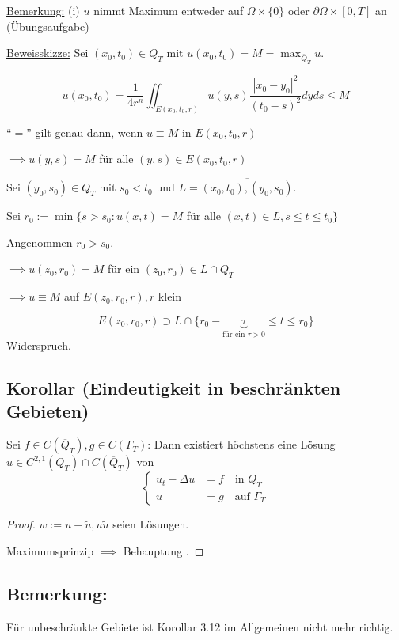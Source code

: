 \underline{Bemerkung:} (i) $u$ nimmt Maximum entweder auf $\Omega \times \{0\}$ oder $\partial \Omega \times [0, T]$ an (Übungsaufgabe)

\underline{Beweisskizze:} Sei $(x_0, t_0) \in Q_T$ mit $u(x_0, t_0) = M = \max_{\overline Q_T} u$.

$$
u(x_0, t_0) = \frac{1}{4r^n} \iint_{E(x_0, t_0, r)} u(y, s) \frac{|x_0 - y_0|^2}{(t_0 - s)^2} dy ds \leq M
$$

``$=$'' gilt genau dann, wenn $u \equiv M$ in $E(x_0, t_0, r)$

$\implies u(y, s) = M$ für alle $(y, s) \in E(x_0, t_0, r)$

Sei $(y_0, s_0) \in Q_T$ mit $s_0 < t_0$ und $L = \overline{(x_0, t_0), (y_0, s_0)}$.

Sei $r_0 := \min\{ s > s_0 \colon u(x, t) = M$ für alle $(x, t) \in L, s \leq t \leq t_0\}$

Angenommen $r_0 > s_0$.

$\implies u(z_0, r_0) = M$ für ein $(z_0, r_0) \in L \cap Q_T$

$\implies u \equiv M$ auf $E(z_0, r_0, r), r$ klein

$$
E(z_0, r_0, r) \supset L \cap \{ r_0 - \underbrace{\tau}_{\text{für ein $\tau > 0$}} \leq t \leq r_0 \}
$$
Widerspruch.

\subsection{Korollar (Eindeutigkeit in beschränkten Gebieten)}

Sei $f \in C(\overline Q_T), g \in C(\Gamma_T)$: Dann existiert höchstens eine Lösung $u \in C^{2,1}(Q_T) \cap C(\overline Q_T)$ von 
$$
\begin{cases}
  u_t - \Delta u &= f \quad\text{in } Q_T \\
  u &= g \quad\text{auf } \Gamma_T
\end{cases}
$$

\begin{proof}
  $w:= u - \tilde u, u \tilde u$ seien Lösungen.

  Maximumsprinzip $\implies$ Behauptung \checkmark.
\end{proof}

\subsection{Bemerkung: }

Für unbeschränkte Gebiete ist Korollar 3.12 im Allgemeinen nicht mehr richtig.

